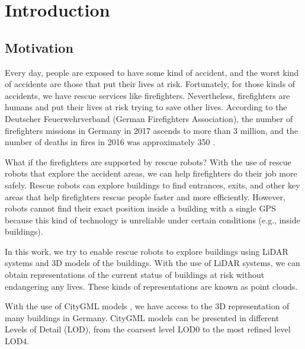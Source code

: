 

    \chapter{Introduction}

    \section{Motivation}
    
        Every day, people are exposed to have some kind of accident, and the worst kind of accidents are those that put their lives at risk.
        Fortunately, for those kinds of accidents, we have rescue services like firefighters.
        Nevertheless, firefighters are humans and put their lives at risk trying to save other lives.
        According to the Deutscher Feuerwehrverband (German Firefighters Association), the number of firefighters missions in Germany in 2017 
        ascends to more than 3 million, and the number of deaths in fires in 2016 was approximately 350 \cite{DeutscherFeuerweherverband_online}.
        \par
        What if the firefighters are supported by rescue robots?
        With the use of rescue robots that explore the accident areas, we can help firefighters do their job more safely.
        Rescue robots can explore buildings to find entrances, exits, and other key areas that help firefighters rescue people faster and more efficiently.
        However, robots cannot find their exact position inside a building with a single GPS because this kind of technology is unreliable under certain conditions 
        (e.g., inside buildings).
        \par
        In this work, we try to enable rescue robots to explore buildings using LiDAR systems and 3D models of the buildings.
        With the use of LiDAR systems, we can obtain representations of the current status of buildings at risk without endangering any lives. 
        These kinds of representations are known as point clouds.
        \par
        With the use of CityGML models \cite{Groger_2012_OGC}, we have access to the 3D representation of many buildings in Germany.
        CityGML models can be presented in different Levels of Detail (LOD), from the coarsest level LOD0 to the most refined level LOD4.
